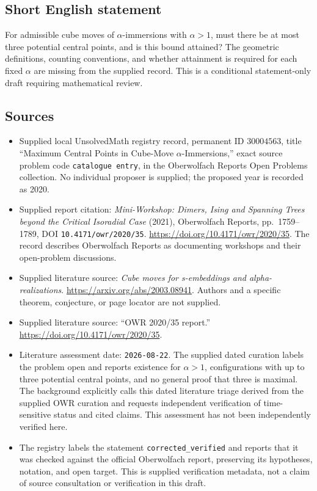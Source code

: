 \documentclass[11pt]{article}
\begin{document}
\subsection{Short English statement}
For admissible cube moves of \(\alpha\)-immersions with \(\alpha>1\), must there be at most three potential central points, and is this bound attained? The geometric definitions, counting conventions, and whether attainment is required for each fixed \(\alpha\) are missing from the supplied record. This is a conditional statement-only draft requiring mathematical review.
\subsection{Sources}
\begin{itemize}
\item Supplied local UnsolvedMath registry record, permanent ID \(30004563\), title ``Maximum Central Points in Cube-Move \(\alpha\)-Immersions,'' exact source problem code \texttt{catalogue entry}, in the Oberwolfach Reports Open Problems collection. No individual proposer is supplied; the proposed year is recorded as 2020.
\item Supplied report citation: \emph{Mini-Workshop: Dimers, Ising and Spanning Trees beyond the Critical Isoradial Case} (2021), Oberwolfach Reports, pp.\ 1759--1789, DOI \texttt{10.4171/owr/2020/35}. \url{https://doi.org/10.4171/owr/2020/35}. The record describes Oberwolfach Reports as documenting workshops and their open-problem discussions.
\item Supplied literature source: \emph{Cube moves for s-embeddings and alpha-realizations}. \url{https://arxiv.org/abs/2003.08941}. Authors and a specific theorem, conjecture, or page locator are not supplied.
\item Supplied literature source: ``OWR 2020/35 report.'' \url{https://doi.org/10.4171/owr/2020/35}.
\item Literature assessment date: \texttt{2026-08-22}. The supplied dated curation labels the problem open and reports existence for \(\alpha>1\), configurations with up to three potential central points, and no general proof that three is maximal. The background explicitly calls this dated literature triage derived from the supplied OWR curation and requests independent verification of time-sensitive status and cited claims. This assessment has not been independently verified here.
\item The registry labels the statement \texttt{corrected\_verified} and reports that it was checked against the official Oberwolfach report, preserving its hypotheses, notation, and open target. This is supplied verification metadata, not a claim of source consultation or verification in this draft.
\end{itemize}
\end{document}
